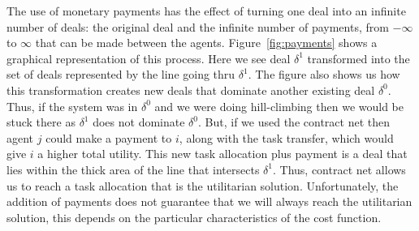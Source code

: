 \begin{SCfigure}
  \begin{minipage}{1.0\linewidth}
    \begin{center}
    \end{center}
  \end{minipage}
  \caption{Deal $\delta^1$ is turned into an infinite number of deals,
    represented by the line that intersects $\delta^1$, with the use
    of payments. Some of those new deals Pareto dominate $\delta^0$,
    as shown by the thicker part of the line.}
  \label{fig:payments}
\end{SCfigure}

The use of monetary payments has the effect of turning one deal into
an infinite number of deals: the original deal and the infinite number
of payments, from $-\infty$ to $\infty$ that can be made between the
agents. Figure~\ref{fig:payments} shows a graphical representation of
this process. Here we see deal $\delta^1$ transformed into the set of
deals represented by the line going thru $\delta^1$. The figure also
shows us how this transformation creates new deals that dominate
another existing deal $\delta^0$. Thus, if the system was in
$\delta^0$ and we were doing hill-climbing then we would be stuck
there as $\delta^1$ does not dominate $\delta^0$. But, if we used the
contract net then agent $j$ could make a payment to $i$, along with
the task transfer, which would give $i$ a higher total utility. This
new task allocation plus payment is a deal that lies within the thick
area of the line that intersects $\delta^1$. Thus, contract net
allows us to reach a task allocation that is the utilitarian solution.
Unfortunately, the addition of payments does not guarantee that we
will always reach the utilitarian solution, this depends on the
particular characteristics of the cost function.

